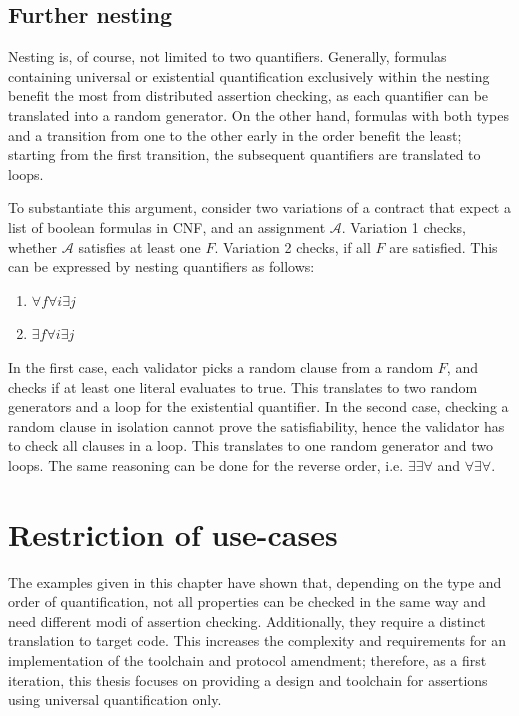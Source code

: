 \subsection{Further nesting}
Nesting is, of course, not limited to two quantifiers. Generally, formulas containing universal or existential quantification exclusively within the nesting benefit the most from distributed assertion checking, as each quantifier can be translated into a random generator. On the other hand, formulas with both types and a transition from one to the other early in the order benefit the least; starting from the first transition, the subsequent quantifiers are translated to loops.

To substantiate this argument, consider two variations of a contract that expect a list of boolean formulas in CNF, and an assignment $\mathcal{A}$. Variation 1 checks, whether $\mathcal{A}$ satisfies at least one $F$. Variation 2 checks, if all $F$ are satisfied. This can be expressed by nesting quantifiers as follows: 
\begin{enumerate}
\item $\forall f \forall i \exists j$
\item $\exists f \forall i \exists j$
\end{enumerate}
In the first case, each validator picks a random clause from a random $F$, and checks if at least one literal evaluates to true. This translates to two random generators and a loop for the existential quantifier. In the second case, checking a random clause in isolation cannot prove the satisfiability, hence the validator has to check all clauses in a loop. This translates to one random generator and two loops. The same reasoning can be done for the reverse order, i.e. $\exists\exists\forall$ and $\forall\exists\forall$.

\section{Restriction of use-cases}\label{sec:restrict}
The examples given in this chapter have shown that, depending on the type and order of quantification, not all properties can be checked in the same way and need different modi of assertion checking. Additionally, they require a distinct translation to target code. This increases the complexity and requirements for an implementation of the toolchain and protocol amendment; therefore, as a first iteration, this thesis focuses on providing a design and toolchain for assertions using universal quantification only.


